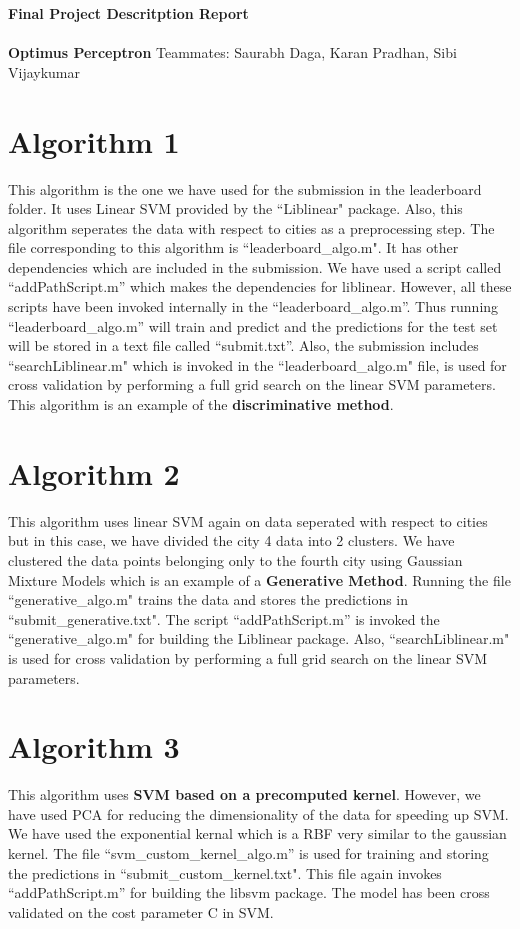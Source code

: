 \documentclass[a4paper, 11pt]{article}
\begin{document}
\noindent
\large\textbf{   \huge Final Project Descritption Report} \\ \\ \hfill \textbf{Optimus Perceptron} \hfill Teammates: Saurabh Daga, Karan Pradhan, Sibi Vijaykumar


\section*{Algorithm 1}
This algorithm is the one we have used for the submission in the leaderboard folder. It uses Linear SVM provided by the ``Liblinear" package. Also, this algorithm seperates the data with respect to cities as a preprocessing step. The file  corresponding to this algorithm is ``leaderboard\_algo.m". It has other dependencies which are included in the submission. We have used a script called ``addPathScript.m'' which makes the 	dependencies for  liblinear. However, all these scripts have been invoked  internally in the ``leaderboard\_algo.m''. Thus running   ``leaderboard\_algo.m'' will train and predict and the predictions for the test set will be stored in a text file called ``submit.txt''. Also, the submission includes ``searchLiblinear.m" which is invoked in the ``leaderboard\_algo.m" file, is used for cross validation by performing a full grid search on the linear SVM parameters. This algorithm is an example of the \textbf{discriminative method}.



\section*{Algorithm 2}
This algorithm uses linear SVM again on data seperated with respect to cities but in this case, we have divided the city 4 data into 2 clusters. We have clustered the data points belonging  only to the fourth city using Gaussian Mixture Models which is an example of a \textbf{Generative Method}. Running the file 	``generative\_algo.m" trains the data and stores the predictions in ``submit\_generative.txt". The script ``addPathScript.m'' is invoked the ``generative\_algo.m" for building the Liblinear package. Also, ``searchLiblinear.m"  is used for cross validation by performing a full grid search on the linear SVM parameters.


\section*{Algorithm 3}
This algorithm uses \textbf{SVM based on a precomputed kernel}. However, we have used PCA for reducing the dimensionality of the data for speeding up SVM. We have used the exponential kernal which is a RBF very similar to the gaussian kernel. The file ``svm\_custom\_kernel\_algo.m'' is used for training and storing the predictions in ``submit\_custom\_kernel.txt". This file again invokes ``addPathScript.m'' for building the libsvm package. The model has been cross validated on the cost parameter C in SVM.
\end{document}
